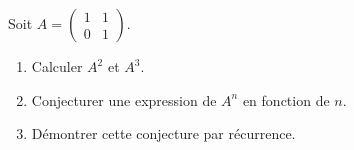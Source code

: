 \documentclass[11pt,fleqn]{book} %
\begin{document}
\begin{exercise}[topic=mat02]
\begin{minipage}{0.2\linewidth}Soit $A=\begin{pmatrix}1 & 1 \\0 & 1 \end{pmatrix}$.
\end{minipage}\hfill \begin{minipage}{0.75\linewidth}
\begin{enumerate}
\item Calculer $A^2$ et $A^3$.
\item Conjecturer une expression de $A^n$ en fonction de $n$.
\item Démontrer cette conjecture par récurrence.
\end{enumerate}
\end{minipage}\end{exercise}
\end{document}
